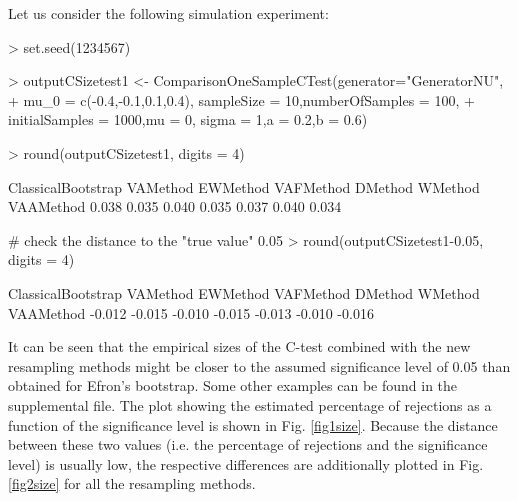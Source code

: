 Let us consider the following simulation experiment:
\begin{example}
> set.seed(1234567)

> outputCSizetest1 <- ComparisonOneSampleCTest(generator="GeneratorNU",
+ mu_0 = c(-0.4,-0.1,0.1,0.4), sampleSize = 10,numberOfSamples = 100,
+ initialSamples = 1000,mu = 0, sigma = 1,a = 0.2,b = 0.6)

> round(outputCSizetest1, digits = 4)

ClassicalBootstrap VAMethod EWMethod VAFMethod DMethod WMethod  VAAMethod
             0.038    0.035    0.040     0.035   0.037   0.040   0.034

# check the distance to the "true value" 0.05
> round(outputCSizetest1-0.05, digits = 4)

ClassicalBootstrap VAMethod EWMethod VAFMethod DMethod WMethod  VAAMethod
            -0.012   -0.015   -0.010    -0.015  -0.013  -0.010   -0.016
\end{example}
It can be seen that the empirical sizes of the C-test combined with the new resampling methods might be closer to the assumed significance level of 0.05 than obtained for Efron's bootstrap. Some other examples can be found in the supplemental file.
The plot showing the estimated percentage of rejections as a function of the significance level is shown in Fig. \ref{fig1size}.
Because the distance between these two values (i.e. the percentage of rejections and the significance level) is usually low, the respective differences are additionally plotted in Fig. \ref{fig2size} for all the resampling methods.

